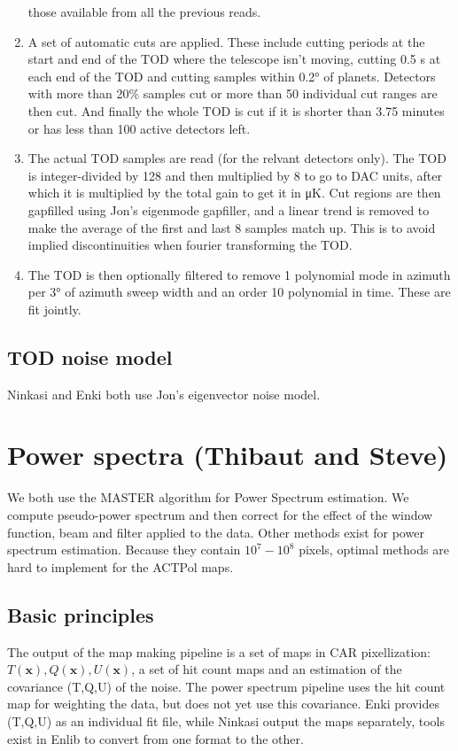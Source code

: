 \documentclass[a4paper, 11pt]{article}
\begin{document}
\begin{enumerate}
	those available from all the previous reads.
\item A set of automatic cuts are applied. These include cutting periods
	at the start and end of the TOD where the telescope isn't moving, cutting
		0.5 s at each end of the TOD and cutting samples within \ang{0.2} of planets.
		Detectors with more than 20\% samples cut or more than 50 individual cut
		ranges are then cut. And finally the whole TOD is cut if it is shorter
		than 3.75 minutes or has less than 100 active detectors left.
\item The actual TOD samples are read (for the relvant detectors only). The TOD is integer-divided by
	128 and then multiplied by 8 to go to DAC units, after which it is multiplied by the total gain to get
		it in \si{\micro\kelvin}. Cut regions are then gapfilled using Jon's eigenmode gapfiller, and a linear trend is removed to
		make the average of the first and last 8 samples match up. This is to avoid implied discontinuities
		when fourier transforming the TOD.
\item The TOD is then optionally filtered to remove 1 polynomial mode in azimuth
	per \ang{3} of azimuth sweep width and an order 10 polynomial in time. These
		are fit jointly.
\end{enumerate}

\subsection{TOD noise model}
Ninkasi and Enki both use Jon's eigenvector noise model.

\section{Power spectra (Thibaut and Steve)}

We both use the MASTER algorithm for Power Spectrum estimation. We compute pseudo-power spectrum and then correct for the effect of the window function, beam and filter applied to the data. Other methods exist for power spectrum estimation. Because they contain $10^{7}-10^{8}$ pixels, optimal methods are hard to implement for the ACTPol maps.

\subsection{Basic principles}\label{subsec:PSbasis}

The output of the map making pipeline is a set of maps in CAR pixellization: $T(\bm{x}), Q(\bm{x}), U(\bm{x})$, a set of hit count maps and an estimation of the covariance (T,Q,U) of the noise. The power spectrum pipeline uses the hit count map for weighting the data, but  does not yet use this covariance.
Enki provides (T,Q,U) as an individual fit file, while Ninkasi output the maps separately, tools exist in Enlib to convert from one format to the other. 
\end{document}
